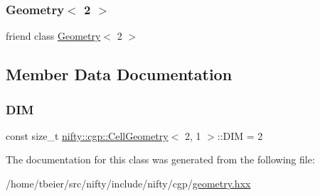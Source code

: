\subsubsection{\texorpdfstring{Geometry$<$ 2 $>$}{Geometry< 2 >}}
{\footnotesize\ttfamily friend class \hyperlink{classnifty_1_1cgp_1_1Geometry}{Geometry}$<$ 2 $>$\hspace{0.3cm}{\ttfamily [friend]}}



\subsection{Member Data Documentation}
\mbox{\label{classnifty_1_1cgp_1_1CellGeometry_3_012_00_011_01_4_a42d125e23384bc4a770893276750d9d1}} 
\subsubsection{\texorpdfstring{D\+IM}{DIM}}
{\footnotesize\ttfamily const size\+\_\+t \hyperlink{classnifty_1_1cgp_1_1CellGeometry}{nifty\+::cgp\+::\+Cell\+Geometry}$<$ 2, 1 $>$\+::D\+IM = 2\hspace{0.3cm}{\ttfamily [static]}}



The documentation for this class was generated from the following file\+:\begin{DoxyCompactItemize}
\item 
/home/tbeier/src/nifty/include/nifty/cgp/\hyperlink{geometry_8hxx}{geometry.\+hxx}\end{DoxyCompactItemize}
